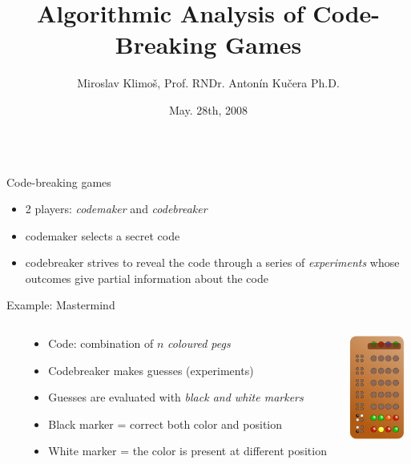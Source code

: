 \documentclass[final]{beamer}
\title{\LARGE Algorithmic Analysis of Code-Breaking Games}
\author{Miroslav Klimoš, Prof. RNDr. Antonín Kučera Ph.D.}
\institute[RWTH Aachen University] %
{
  Faculty of Informatics, Masaryk University, Brno
}
\date[May. 28th, 2008]{May. 28th, 2008}
\begin{document}
\begin{frame}{} 
\begin{columns}[t]
  \begin{column}{.48\linewidth}
    
    \begin{block}{Code-breaking games}
      \begin{itemize}
      \item 2 players: \emph{codemaker} and \emph{codebreaker}
      \item codemaker selects a secret code
      \item codebreaker strives to reveal the code through a series of \emph{experiments} whose outcomes give partial information about the code
      \end{itemize}
    \end{block}
    
    \begin{block}{Example: Mastermind}
    \begin{columns}
      \begin{column}{\parindent}\end{column}
      \begin{column}{.78\textwidth}
        \begin{itemize}
        \item Code: combination of $n$ \emph{coloured pegs}
        \item Codebreaker makes guesses (experiments)
        \item Guesses are evaluated with \emph{black and white markers}
        \item Black marker = correct both color and position
        \item White marker = the color is present at different position
        \end{itemize}
      \end{column}

      \begin{column}{.22\textwidth}
        \includegraphics[width=1.8cm]{../pictures/mastermind.png}
      \end{column}
    \end{columns}
    \end{block}
    

\end{column}
\end{columns}
\end{frame}
\end{document}
